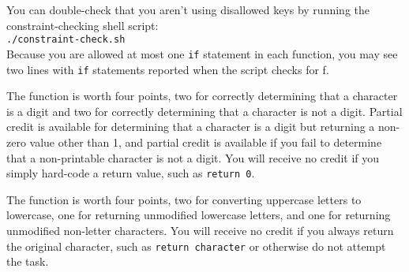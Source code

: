 You can double-check that you aren't using disallowed keys by running the constraint-checking shell script: \\
\texttt{./constraint-check.sh} \\
Because you are allowed at most one \lstinline{if} statement in each function, you may see two lines with \lstinline{if} statements reported when the script checks for \textquotesingle f\textquotesingle.

The  function is worth four points, two for correctly determining that a character is a digit and two for correctly determining that a character is not a digit.
Partial credit is available for determining that a character is a digit but returning a non-zero value other than 1, and partial credit is available if you fail to determine that a non-printable character is not a digit.
You will receive no credit if you simply hard-code a return value, such as \lstinline{return 0}.

The  function is worth four points, two for converting uppercase letters to lowercase, one for returning unmodified lowercase letters, and one for returning unmodified non-letter characters.
You will receive no credit if you always return the original character, such as \lstinline{return character} or otherwise do not attempt the task.
